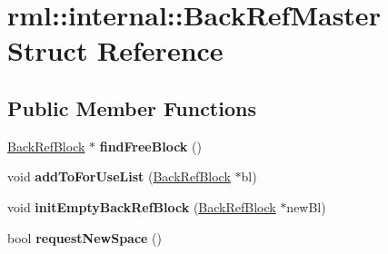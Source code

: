 \hypertarget{structrml_1_1internal_1_1BackRefMaster}{}\section{rml\+:\+:internal\+:\+:Back\+Ref\+Master Struct Reference}
\label{structrml_1_1internal_1_1BackRefMaster}
\subsection*{Public Member Functions}
\begin{DoxyCompactItemize}
\item 
\hypertarget{structrml_1_1internal_1_1BackRefMaster_a056dffdc21ba76ee2ddac9c01f2ef2dd}{}\hyperlink{structrml_1_1internal_1_1BackRefBlock}{Back\+Ref\+Block} $\ast$ {\bfseries find\+Free\+Block} ()\label{structrml_1_1internal_1_1BackRefMaster_a056dffdc21ba76ee2ddac9c01f2ef2dd}

\item 
\hypertarget{structrml_1_1internal_1_1BackRefMaster_a37ff8568740208b7e96498e34b02cfb0}{}void {\bfseries add\+To\+For\+Use\+List} (\hyperlink{structrml_1_1internal_1_1BackRefBlock}{Back\+Ref\+Block} $\ast$bl)\label{structrml_1_1internal_1_1BackRefMaster_a37ff8568740208b7e96498e34b02cfb0}

\item 
\hypertarget{structrml_1_1internal_1_1BackRefMaster_a95aa7e0acc7e9849781dc1d4a73acd5c}{}void {\bfseries init\+Empty\+Back\+Ref\+Block} (\hyperlink{structrml_1_1internal_1_1BackRefBlock}{Back\+Ref\+Block} $\ast$new\+Bl)\label{structrml_1_1internal_1_1BackRefMaster_a95aa7e0acc7e9849781dc1d4a73acd5c}

\item 
\hypertarget{structrml_1_1internal_1_1BackRefMaster_a3665e2685e73543736ddffb5a8495b48}{}bool {\bfseries request\+New\+Space} ()\label{structrml_1_1internal_1_1BackRefMaster_a3665e2685e73543736ddffb5a8495b48}

\end{DoxyCompactItemize}
